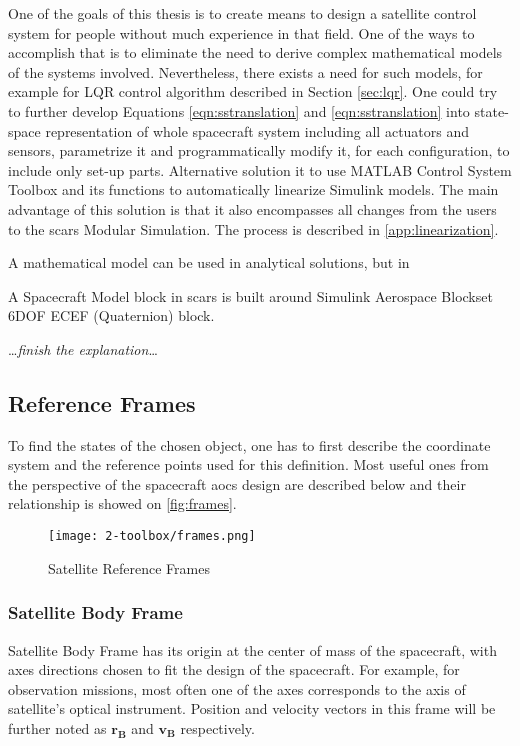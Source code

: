     One of the goals of this thesis is to create means to design a satellite control system for people without much experience in that field. One of the ways to accomplish that is to eliminate the need to derive complex mathematical models of the systems involved. Nevertheless, there exists a need for such models, for example for LQR control algorithm described in Section \ref{sec:lqr}. One could try to further develop Equations \ref{eqn:sstranslation} and \ref{eqn:sstranslation} into state-space representation of whole spacecraft system including all actuators and sensors, parametrize it and programmatically modify it, for each configuration, to include only set-up parts. Alternative solution it to use MATLAB Control System Toolbox and its functions to automatically linearize Simulink models. The main advantage of this solution is that it also encompasses all changes from the users to the \ac{scars} Modular Simulation. The process is described in \autoref{app:linearization}.

    A mathematical model can be used in analytical solutions, but in 
    
    A Spacecraft Model block in \ac{scars} is built around Simulink Aerospace Blockset 6DOF ECEF (Quaternion) block.

    \dots\textit{finish the explanation}\dots



\subsection{Reference Frames}
    To find the states of the chosen object, one has to first describe the coordinate system and the reference points used for this definition. Most useful ones from the perspective of the spacecraft \ac{aocs} design are described below and their relationship is showed on \autoref{fig:frames}.

    \begin{figure}[H]
        \centering
        \texttt{[image: 2-toolbox/frames.png]}
        \caption{Satellite Reference Frames\cite{6ecef-frames}}
        \label{fig:frames}
    \end{figure}

    \subsubsection{Satellite Body Frame}
        Satellite Body Frame has its origin at the center of mass of the spacecraft, with axes directions chosen to fit the design of the spacecraft. For example, for observation missions, most often one of the axes corresponds to the axis of satellite's optical instrument. Position and velocity vectors in this frame will be further noted as $\textbf{r}_\textbf{B}$ and $\textbf{v}_\textbf{B}$ respectively.

